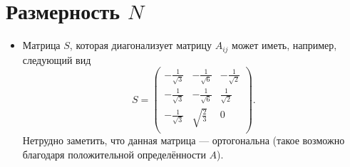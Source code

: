 \documentclass[a4paper]{article}
\begin{document}
\section{Размерность $N$}
\begin{itemize}
\item Матрица $S$, которая диагонализует матрицу $A_{ij}$
	может иметь, например, следующий вид
	\[
	S=
\begin{pmatrix}
 -\frac{1}{\sqrt{3}} & -\frac{1}{\sqrt{6}} & -\frac{1}{\sqrt{2}} \\
 -\frac{1}{\sqrt{3}} & -\frac{1}{\sqrt{6}} & \frac{1}{\sqrt{2}} \\
 -\frac{1}{\sqrt{3}} & \sqrt{\frac{2}{3}} & 0 \\
\end{pmatrix}
.\]
Нетрудно заметить, что данная матрица --- ортогональна (такое
возможно благодаря положительной определённости $A$).


\end{itemize}
\end{document}
